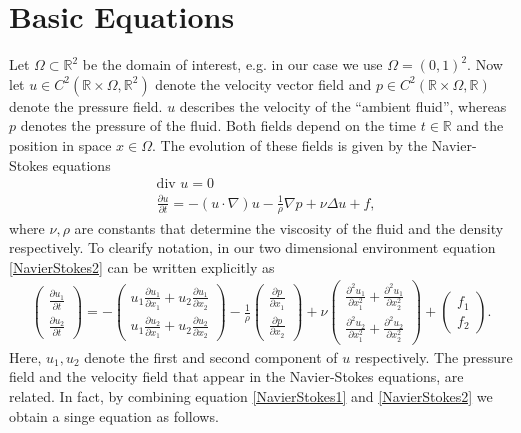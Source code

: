 \documentclass[a4paper,10pt,oneside,final,german,openbib,pdftex,titlepage]{scrbook}
\begin{document}
\section{Basic Equations}
Let $\Omega \subset \mathbb{R}^2$ be the domain of interest, e.g. in our case we use $\Omega = (0,1)^2$. Now let $u \in C^2(\mathbb{R} \times \Omega,\mathbb{R}^2)$ denote the velocity vector field and $p\in C^2(\mathbb{R} \times \Omega,\mathbb{R})$ denote the pressure field. $u$ describes the velocity of the ``ambient fluid'', whereas $p$ denotes the pressure of the fluid. Both fields depend on the time $t\in \mathbb{R}$ and the position in space $x\in \Omega$. The evolution of these fields is given by the Navier-Stokes equations
\begin{align}
	&\text{div } u = 0 \label{NavierStokes1}
	\\
	&\frac{\partial u}{\partial t} = - (u \cdot \nabla)u - \frac{1}{\rho}\nabla p + \nu \Delta u + f, \label{NavierStokes2}
\end{align}
where $\nu, \rho$ are constants that determine the viscosity of the fluid and the density respectively.
To clearify notation, in our two dimensional environment equation \ref{NavierStokes2} can be written explicitly as
\begin{align*}
	\left( \begin{matrix}
	\frac{\partial u_1}{\partial t} \\ \frac{\partial u_2}{\partial t}
	\end{matrix} \right) = - \left(\begin{matrix}
	u_1 \frac{\partial u_1}{\partial x_1} + u_2 \frac{\partial u_1}{\partial x_2} \\ u_1 \frac{\partial u_2}{\partial x_1} + u_2 \frac{\partial u_2}{\partial x_2}
	\end{matrix} \right)  - \frac{1}{\rho} \left( \begin{matrix}
	\frac{\partial p}{\partial x_1} \\ \frac{\partial p}{\partial x_2}
\end{matrix}\right)	 + \nu \left( \begin{matrix}
	\frac{\partial^2 u_1}{\partial x_1^2} + \frac{\partial^2 u_1}{\partial x_2^2} \\ \frac{\partial^2 u_2}{\partial x_1^2} + \frac{\partial^2 u_2}{\partial x_2^2}
	\end{matrix} \right) + \left( \begin{matrix}
	f_1 \\ f_2
	\end{matrix} \right).
\end{align*}
Here, $u_1, u_2$ denote the first and second component of $u$ respectively. The pressure field and the velocity field that appear in the Navier-Stokes equations, are related. In fact, by combining equation \ref{NavierStokes1} and \ref{NavierStokes2} we obtain a singe equation as follows.\\
\end{document}
